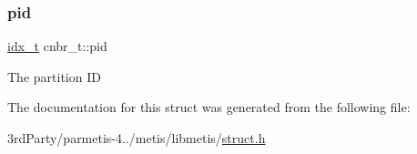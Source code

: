 \subsubsection{\texorpdfstring{pid}{pid}}
{\footnotesize\ttfamily \hyperlink{3rd_party_2parmetis-4_80_83_2metis_2include_2metis_8h_aaa5262be3e700770163401acb0150f52}{idx\+\_\+t} cnbr\+\_\+t\+::pid}

The partition ID 

The documentation for this struct was generated from the following file\+:\begin{DoxyCompactItemize}
\item 
3rd\+Party/parmetis-\/4../metis/libmetis/\hyperlink{metis_2libmetis_2struct_8h}{struct.\+h}\end{DoxyCompactItemize}
